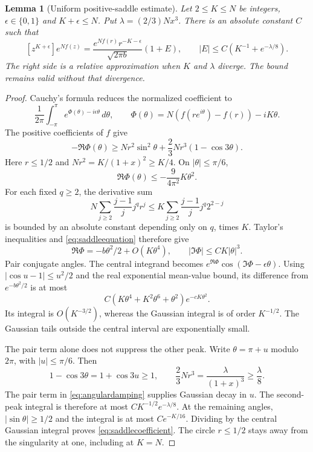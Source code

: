 \documentclass[11pt]{article}
\newtheorem{lemma}[theorem]{Lemma}
\theoremstyle{definition}
\theoremstyle{remark}
\newcommand{\1}{\mathbf 1}
\begin{document}
\begin{lemma}[Uniform positive-saddle estimate]\label{lem:saddle}
Let $2\le K\le N$ be integers, $\epsilon\in\{0,1\}$ and $K+\epsilon\le N$. Put $\lambda=(2/3)Nx^3$. There is an absolute constant $C$ such that
\begin{equation}\label{eq:saddlecoefficient}
[z^{K+\epsilon}]e^{Nf(z)}
=\frac{e^{Nf(r)}r^{-K-\epsilon}}{\sqrt{2\pi b}}(1+E),
\qquad |E|\le C\left(K^{-1}+e^{-\lambda/8}\right).
\end{equation}
The right side is a relative approximation when $K$ and $\lambda$ diverge. The bound remains valid without that divergence.
\end{lemma}
\begin{proof}
Cauchy's formula reduces the normalized coefficient to
\[
\frac1{2\pi}\int_{-\pi}^{\pi}
e^{\Phi(\theta)-i\epsilon\theta}\,d\theta,
\qquad
\Phi(\theta)=N(f(re^{i\theta})-f(r))-iK\theta.
\]
The positive coefficients of $f$ give
\begin{equation}\label{eq:angulardamping}
-\Re\Phi(\theta)
\ge Nr^2\sin^2\theta+\frac23Nr^3(1-\cos3\theta).
\end{equation}
Here $r\le1/2$ and $Nr^2=K/(1+x)^2\ge K/4$. On $|\theta|\le\pi/6$,
\[
\Re\Phi(\theta)\le-\frac9{4\pi^2}K\theta^2.
\]
For each fixed $q\ge2$, the derivative sum
\[
N\sum_{j\ge2}\frac{j-1}{j}j^qr^j
\le K\sum_{j\ge2}\frac{j-1}{j}j^q2^{2-j}
\]
is bounded by an absolute constant depending only on $q$, times $K$. Taylor's inequalities and \eqref{eq:saddleequation} therefore give
\[
\Re\Phi=-b\theta^2/2+O(K\theta^4),\qquad
|\Im\Phi|\le CK|\theta|^3.
\]
Pair conjugate angles. The central integrand becomes
$e^{\Re\Phi}\cos(\Im\Phi-\epsilon\theta)$. Using
$|\cos u-1|\le u^2/2$ and the real exponential mean-value bound, its difference from $e^{-b\theta^2/2}$ is at most
\[
C(K\theta^4+K^2\theta^6+\theta^2)e^{-cK\theta^2}.
\]
Its integral is $O(K^{-3/2})$, whereas the Gaussian integral is of order $K^{-1/2}$. The Gaussian tails outside the central interval are exponentially small.

The pair term alone does not suppress the other peak. Write $\theta=\pi+u$ modulo $2\pi$, with $|u|\le\pi/6$. Then
\[
1-\cos3\theta=1+\cos3u\ge1,\qquad
\frac23Nr^3=\frac\lambda{(1+x)^3}\ge\frac\lambda8.
\]
The pair term in \eqref{eq:angulardamping} supplies Gaussian decay in $u$. The second-peak integral is therefore at most $CK^{-1/2}e^{-\lambda/8}$. At the remaining angles, $|\sin\theta|\ge1/2$ and the integral is at most $Ce^{-K/16}$. Dividing by the central Gaussian integral proves \eqref{eq:saddlecoefficient}. The circle $r\le1/2$ stays away from the singularity at one, including at $K=N$.
\end{proof}
\end{document}
